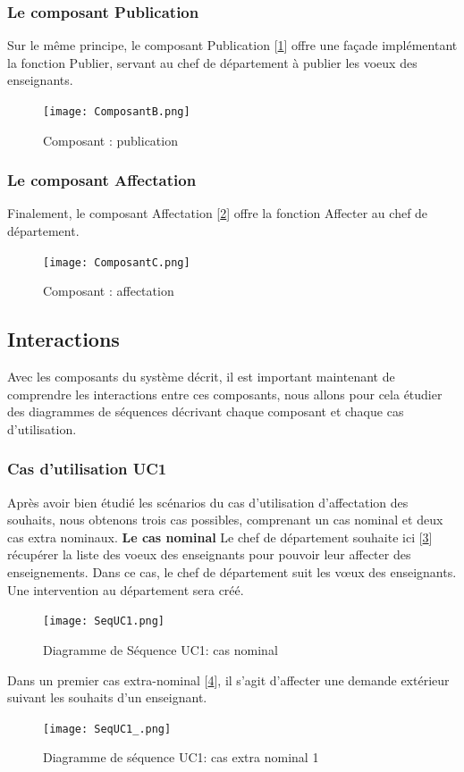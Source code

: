 \documentclass[a4paper,11pt]{article}
\newcommand{\br}{\\\mbox{}}
\begin{document}
\subsubsection{Le composant Publication}
Sur le même principe, le composant Publication [\ref{DSUC2}] offre une façade implémentant la fonction Publier, servant au chef de département à publier les voeux des enseignants.
\begin{figure}[ht]
\centering
\texttt{[image: ComposantB.png]}
\caption{Composant : publication}
\label{DSUC2}
\end{figure}
\subsubsection{Le composant Affectation}
Finalement, le composant Affectation [\ref{DSUC3}] offre la fonction Affecter au chef de département.
\begin{figure}[ht]
\centering
\texttt{[image: ComposantC.png]}
\caption{Composant : affectation}
\label{DSUC3}
\end{figure}
\subsection{Interactions}
Avec les composants du système décrit, il est important maintenant de comprendre les interactions entre ces composants, nous allons pour cela étudier des diagrammes de séquences décrivant chaque composant et chaque cas d'utilisation.
\subsubsection{Cas d’utilisation UC1}
Après avoir bien étudié les scénarios du cas d'utilisation d'affectation des souhaits, nous obtenons trois cas possibles, comprenant un cas nominal et deux cas extra nominaux.
\textbf{Le cas nominal}
Le chef de département souhaite ici [\ref{DUC1}] récupérer la liste des voeux des enseignants pour pouvoir leur affecter des enseignements. Dans ce cas, le chef de département suit les vœux des enseignants. Une intervention au département sera créé.\br
\begin{figure}
\centering
\texttt{[image: SeqUC1.png]}
\caption{Diagramme de Séquence UC1: cas nominal}
\label{DUC1}
\end{figure}
Dans un premier cas extra-nominal [\ref{DUC1_}], il s'agit d'affecter une demande extérieur suivant les souhaits d'un enseignant.
\begin{figure}

\centering
\texttt{[image: SeqUC1\_.png]}
\caption{Diagramme de séquence UC1: cas extra nominal 1}
\label{DUC1_}
\end{figure}
\end{document}
